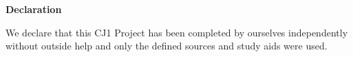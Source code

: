 \clearpage
\thispagestyle{plain}
\ITocEntryStatement
\textbf{\sffamily\large Declaration}

We declare that this CJ1 Project has been completed
by ourselves independently without outside help
and only the defined sources and study aids were used.


\vspace{1cm}
\noindent\makebox[3cm]{\hrulefill} \hspace{0.1cm}
    \makebox[3cm]{\hrulefill} \hspace{0.1cm}
    \makebox[6cm]{\hrulefill} \\
\noindent{} \hspace{0.1cm}
     \hspace{0.1cm}

\vspace{1cm}
\noindent\makebox[3cm]{\hrulefill} \hspace{0.1cm}
\makebox[3cm]{\hrulefill} \hspace{0.1cm}
\makebox[6cm]{\hrulefill} \\
\noindent{} \hspace{0.1cm}
 \hspace{0.1cm}

\vspace{1cm}
\noindent\makebox[3cm]{\hrulefill} \hspace{0.1cm}
\makebox[3cm]{\hrulefill} \hspace{0.1cm}
\makebox[6cm]{\hrulefill} \\
\noindent{} \hspace{0.1cm}
 \hspace{0.1cm}

\clearpage
